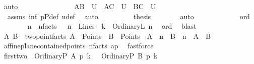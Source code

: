 \begin{isabellebody}
\ auto\isanewline
\ \ \ \ \ \ \isamarkupfalse%
\isanewline
\ \ \ \ \ \ \isamarkupfalse%
\ {}{}{\isacharcolon}{\kern0pt}\ {\isachardoublequoteopen}{\isacharquery}{\kern0pt}AB\ {\isasymin}\ U\ {\isasymand}\ {\isacharquery}{\kern0pt}AC\ {\isasymin}\ U\ {\isasymand}\ {\isacharquery}{\kern0pt}BC\ {\isasymin}\ U{\isachardoublequoteclose}\ \isanewline
\ \ \ \ \ \ \isamarkupfalse%
\ {\isachardoublequoteopen}{}{}{\isachardoublequoteclose}\ assms{\isacharparenleft}{\kern0pt}{}{\isacharparenright}{\kern0pt}\ inf\ pPdef\ u{\isacharunderscore}{\kern0pt}def\ \isamarkupfalse%
\ auto\isanewline
\ \ \ \ \ \ \isamarkupfalse%
\ \isamarkupfalse%
\ {\isacharquery}{\kern0pt}thesis\ \isamarkupfalse%
\ {}{}\ {}{}\ {}{}\ {}{}\ \isamarkupfalse%
\ auto\isanewline
\ \ \ \ \isamarkupfalse%
\isanewline
\ \ \ \ \ \ \isamarkupfalse%
\ ord\isanewline
\ \ \ \ \ \ \isamarkupfalse%
\ n\ \ n{\isacharunderscore}{\kern0pt}facts{\isacharcolon}{\kern0pt}\ \ {\isachardoublequoteopen}\ {\isacharparenleft}{\kern0pt}n\ {\isasymin}\ Lines{\isacharparenright}{\kern0pt}\ {\isasymand}\ {\isacharparenleft}{\kern0pt}k\ {\isacharequal}{\kern0pt}\ OrdinaryL\ n{\isacharparenright}{\kern0pt}{\isachardoublequoteclose}\ \isamarkupfalse%
\ ord\ \isamarkupfalse%
\ blast\isanewline
\ \ \ \ \ \ \isamarkupfalse%
\ A\ B\ \ two{\isacharunderscore}{\kern0pt}point{\isacharunderscore}{\kern0pt}facts{\isacharcolon}{\kern0pt}\ {\isachardoublequoteopen}A\ {\isasymin}\ Points\ {\isasymand}\ B\ {\isasymin}\ Points\ {\isasymand}\ A\ {\isasymlhd}\ n\ {\isasymand}\ B\ {\isasymlhd}\ n\ {\isasymand}\ A\ {\isasymnoteq}\ B{\isachardoublequoteclose}\ \isanewline
\ \ \ \ \ \ \ \ \isamarkupfalse%
\ affine{\isacharunderscore}{\kern0pt}plane{\isachardot}{\kern0pt}contained{\isacharunderscore}{\kern0pt}points\ n{\isacharunderscore}{\kern0pt}facts\ ap\ \isamarkupfalse%
\ fastforce\isanewline
\ \ \ \ \ \ \isamarkupfalse%
\ first{\isacharunderscore}{\kern0pt}two{\isacharcolon}{\kern0pt}\ {\isachardoublequoteopen}\ {\isacharparenleft}{\kern0pt}OrdinaryP\ A{\isacharparenright}{\kern0pt}\ p{\isasymlhd}\ k\ {\isasymand}\ \ {\isacharparenleft}{\kern0pt}OrdinaryP\ B{\isacharparenright}{\kern0pt}\ p{\isasymlhd}\ k{\isachardoublequoteclose}\ \isamarkupfalse%

\end{isabellebody}
